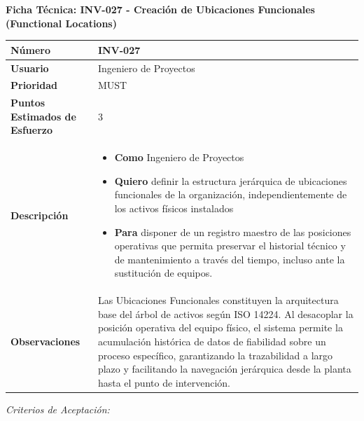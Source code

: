 \vspace{1em}
\noindent\textbf{Ficha Técnica: INV-027 - Creación de Ubicaciones Funcionales (Functional Locations)}
\footnotesize\setlength{\tabcolsep}{4pt}\renewcommand{\arraystretch}{1.2}
\begin{longtable}{|p{0.21\textwidth}|p{0.74\textwidth}|}\hline
\textbf{Número} & INV-027 \\ \hline
\textbf{Usuario} & Ingeniero de Proyectos \\ \hline
\textbf{Prioridad} & MUST \\ \hline
\textbf{Puntos Estimados de Esfuerzo} & 3 \\ \hline
\textbf{Descripción} & \parbox[t]{\linewidth}{\vspace{2pt}\begin{itemize}[leftmargin=1.5em, nosep, topsep=0pt]
\item \textbf{Como} Ingeniero de Proyectos
\item \textbf{Quiero} definir la estructura jerárquica de ubicaciones funcionales de la organización, independientemente de los activos físicos instalados
\item \textbf{Para} disponer de un registro maestro de las posiciones operativas que permita preservar el historial técnico y de mantenimiento a través del tiempo, incluso ante la sustitución de equipos.
\end{itemize}\vspace{2pt}} \\ \hline
\textbf{Observaciones} & Las Ubicaciones Funcionales constituyen la arquitectura base del árbol de activos según ISO 14224. Al desacoplar la posición operativa del equipo físico, el sistema permite la acumulación histórica de datos de fiabilidad sobre un proceso específico, garantizando la trazabilidad a largo plazo y facilitando la navegación jerárquica desde la planta hasta el punto de intervención. \\ \hline
\end{longtable}\normalsize
\noindent\textit{Criterios de Aceptación:}
